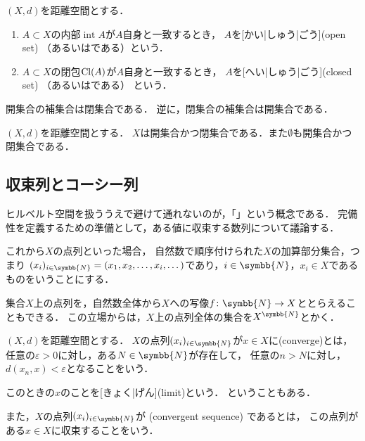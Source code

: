 \documentclass[../sotsu.tex]{subfiles}
\begin{document}
\begin{definition}[開集合と閉集合]
    \label{dfn:open-set-and-closed-set}
    \label{dfn:open-set}
    \label{dfn:closed-set}
    $(X, d)$を距離空間とする．
    \begin{enumerate}
        \item 
            $A \subset X$の内部$\operatorname{int} A$が$A$自身と一致するとき，
            $A$を[かい|しゅう|ごう](open set)
            （あるいはである）という．
        \item 
            $A \subset X$の閉包$\mathrm{Cl}(A)$が$A$自身と一致するとき，
            $A$を[へい|しゅう|ごう](closed set)
            （あるいはである） という．
    \end{enumerate}
\end{definition}

開集合の補集合は閉集合である．
逆に，閉集合の補集合は開集合である．


\begin{example}
    $(X, d)$を距離空間とする．
    $X$は開集合かつ閉集合である．また$\emptyset$も開集合かつ閉集合である．
\end{example}



\subsection{収束列とコーシー列}

ヒルベルト空間を扱ううえで避けて通れないのが，「」という概念である．
完備性を定義するための準備として，ある値に収束する数列について議論する．

これから$X$の点列といった場合，
自然数で順序付けられた$X$の加算部分集合，つまり
$\sequ{x_i}[i \in \symbb{N}] = (x_1, x_2, \dots, x_i, \dotsc)$であり，$i \in \symbb{N}$，$x_i \in X$であるものをいうことにする．

集合$X$上の点列を，自然数全体から$X$への写像$f \colon \symbb{N} \to X$ととらえることもできる．
この立場からは，$X$上の点列全体の集合を$X^{\symbb{N}}$とかく．

\begin{definition}[収束列]
    \label{dfn:convergent-sequence}
    $(X, d)$を距離空間とする．
    $X$の点列$\sequ{x_i}[i \in \symbb{N}]$が$x \in X$に(converge)とは，
    任意の$\varepsilon > 0$に対し，ある$N \in \symbb{N}$が存在して，
    任意の$n > N$に対し，$d(x_n, x) < \varepsilon$となることをいう．
    
    このときの$x$のことを[きょく|げん](limit)という\cite{uchida-set-2020}．
    ということもある．

    また，$X$の点列$\sequ{x_i}[i \in \symbb{N}]$が%
    (convergent sequence)%
    であるとは，
    この点列がある$x \in X$に収束することをいう．
\end{definition}
\end{document}
